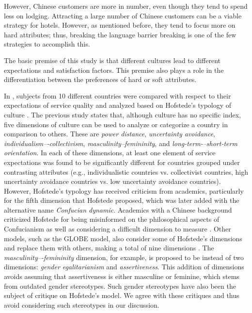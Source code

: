 \documentclass[smallextended,natbib]{svjour3}       %
\begin{document}
    However, Chinese customers are more in number, even though they tend to spend less on lodging. Attracting a large number of Chinese customers can be a viable strategy for hotels. However, as mentioned before, they tend to focus more on hard attributes; thus, breaking the language barrier breaking is one of the few strategies to accomplish this.

    The basic premise of this study is that different cultures lead to different expectations and satisfaction factors. This premise also plays a role in the differentiation between the preferences of hard or soft attributes.

    In \cite{donthu1998cultural}, subjects from 10 different countries were compared with respect to their expectations of service quality and analyzed based on Hofstede's typology of culture \cite[][]{hofstede1984culture}. The previous study states that, although culture has no specific index, five dimensions of culture can be used to analyze or categorize a country in comparison to others. These are \textit{power distance}, \textit{uncertainty avoidance}, \textit{individualism–-collectivism}, \textit{masculinity–femininity}, and \textit{long-term-–short-term orientation}. In each of these dimensions, at least one element of service expectations was found to be significantly different for countries grouped under contrasting attributes (e.g., individualistic countries vs. collectivist countries, high uncertainty avoidance countries vs. low uncertainty avoidance countries). However, Hofstede's typology has received criticism from academics, particularly for the fifth dimension that Hofstede proposed, which was later added with the alternative name \textit{Confucian dynamic}. Academics with a Chinese background criticized Hofstede for being misinformed on the philosophical aspects of Confucianism as well as considering a difficult dimension to measure \cite[][]{fang2003critique}. Other models, such as the GLOBE model, also consider some of Hofstede's dimensions and replace them with others, making a total of nine dimensions \cite[][]{house1999cultural}. The \textit{masculinity–-femininity} dimension, for example, is proposed to be instead of two dimensions: \textit{gender egalitarianism} and \textit{assertiveness}. This addition of dimensions avoids assuming that assertiveness is either masculine or feminine, which stems from outdated gender stereotypes. Such gender stereotypes have also been the subject of critique on Hofstede's model\cite[][]{jeknic2014gender}. We agree with these critiques and thus avoid considering such stereotypes in our discussion.
    
\end{document}
